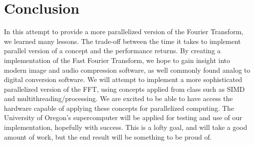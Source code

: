 \documentclass[12pt]{extarticle}
\begin{document}
\section*{Conclusion}
	In this attempt to provide a more parallelized version of the Fourier Transform, we learned many lessons. The trade-off between the time it takes to 
	implement parallel version of a concept and the performance returns.
	By creating a implementation of the Fast Fourier Transform, we hope to gain insight into modern image and audio compression software, as well commonly found analog to digital conversion software.
    We will attempt to implement a more sophisticated parallelized version of the FFT, using concepts applied from class such as SIMD and multithreading/processing.
    We are excited to be able to have access the hardware capable of applying these concepts for parallelized computing.
	The University of Oregon's supercomputer will be applied for testing and use of our implementation, hopefully with success. 
	This is a lofty goal, and will take a good amount of work, but the end result will be something to be proud of.


\end{document}
